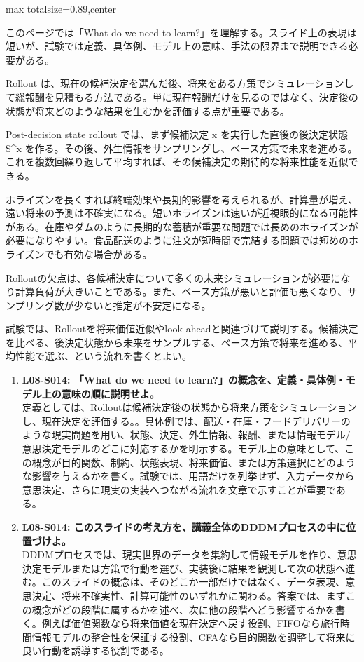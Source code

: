 \begin{minipage}[t]{0.58\textwidth}
\begin{adjustbox}{max totalsize={\textwidth}{0.89\textheight},center}
\begin{minipage}{\textwidth}\scriptsize
{}このページでは「What do we need to learn?」を理解する。スライド上の表現は短いが、試験では定義、具体例、モデル上の意味、手法の限界まで説明できる必要がある。\par
Rollout は、現在の候補決定を選んだ後、将来をある方策でシミュレーションして総報酬を見積もる方法である。単に現在報酬だけを見るのではなく、決定後の状態が将来どのような結果を生むかを評価する点が重要である。\par
Post-decision state rollout では、まず候補決定 x を実行した直後の後決定状態 S\textasciicircum{}x を作る。その後、外生情報をサンプリングし、ベース方策で未来を進める。これを複数回繰り返して平均すれば、その候補決定の期待的な将来性能を近似できる。\par
ホライズンを長くすれば終端効果や長期的影響を考えられるが、計算量が増え、遠い将来の予測は不確実になる。短いホライズンは速いが近視眼的になる可能性がある。在庫やダムのように長期的な蓄積が重要な問題では長めのホライズンが必要になりやすい。食品配送のように注文が短時間で完結する問題では短めのホライズンでも有効な場合がある。\par
Rolloutの欠点は、各候補決定について多くの未来シミュレーションが必要になり計算負荷が大きいことである。また、ベース方策が悪いと評価も悪くなり、サンプリング数が少ないと推定が不安定になる。\par
試験では、Rolloutを将来価値近似やlook-aheadと関連づけて説明する。候補決定を比べる、後決定状態から未来をサンプルする、ベース方策で将来を進める、平均性能で選ぶ、という流れを書くとよい。\par{}\begin{enumerate}\item \textbf{L08-S014: 「What do we need to learn?」の概念を、定義・具体例・モデル上の意味の順に説明せよ。}\\定義としては、Rolloutは候補決定後の状態から将来方策をシミュレーションし、現在決定を評価する。。具体例では、配送・在庫・フードデリバリーのような現実問題を用い、状態、決定、外生情報、報酬、または情報モデル/意思決定モデルのどこに対応するかを明示する。モデル上の意味として、この概念が目的関数、制約、状態表現、将来価値、または方策選択にどのような影響を与えるかを書く。試験では、用語だけを列挙せず、入力データから意思決定、さらに現実の実装へつながる流れを文章で示すことが重要である。\item \textbf{L08-S014: このスライドの考え方を、講義全体のDDDMプロセスの中に位置づけよ。}\\DDDMプロセスでは、現実世界のデータを集約して情報モデルを作り、意思決定モデルまたは方策で行動を選び、実装後に結果を観測して次の状態へ進む。このスライドの概念は、そのどこか一部だけではなく、データ表現、意思決定、将来不確実性、計算可能性のいずれかに関わる。答案では、まずこの概念がどの段階に属するかを述べ、次に他の段階へどう影響するかを書く。例えば価値関数なら将来価値を現在決定へ戻す役割、FIFOなら旅行時間情報モデルの整合性を保証する役割、CFAなら目的関数を調整して将来に良い行動を誘導する役割である。\end{enumerate}

\end{minipage}
\end{adjustbox}
\end{minipage}
